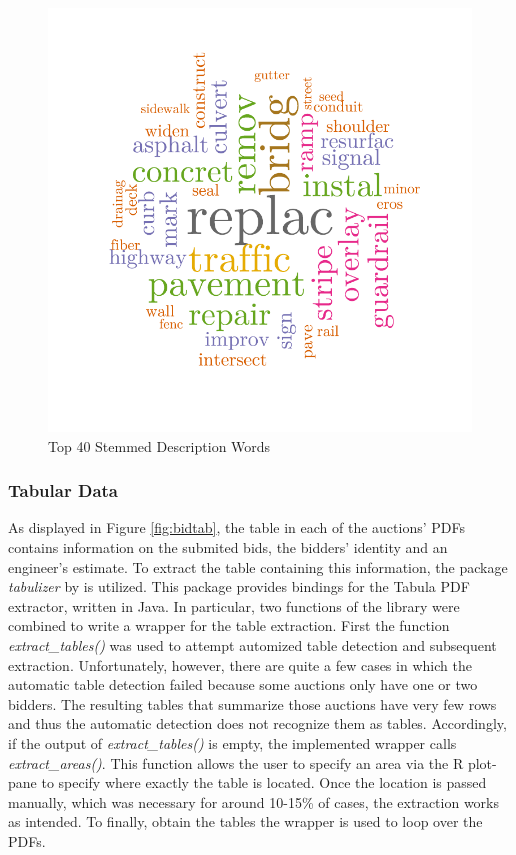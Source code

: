 \documentclass[a4paper,12pt, headsepline]{scrartcl}
\numberwithin{equation}{section}
\begin{document}
\begin{figure}[H]
	\includegraphics[width = 13.4	cm]{figures/description_words_cloud.pdf}
	\caption{Top 40 Stemmed Description Words}\label{fig:desc}
\end{figure}

\subsubsection{Tabular Data}\label{subsec:tab}

As displayed in Figure \ref{fig:bidtab}, the table in each of the auctions' PDFs contains information on the submited bids, the bidders' identity and an engineer's estimate. To extract the table containing this information, the package \textit{tabulizer} by \citet{tabulizer} is utilized. This package provides bindings for the Tabula PDF extractor, written in Java. In particular, two functions of the library were combined to write a wrapper for the table extraction. First the function \textit{extract\_tables()} was used to attempt automized table detection and subsequent extraction. Unfortunately, however, there are quite a few cases in which the automatic table detection failed because some auctions only have one or two bidders. The resulting tables that summarize those auctions have very few rows and thus the automatic detection does not recognize them as tables. Accordingly, if the output of \textit{extract\_tables()} is empty, the implemented wrapper calls \textit{extract\_areas()}. This function allows the user to specify an area via the R plot-pane to specify where exactly the table is located. Once the location is passed manually, which was necessary for around 10-15\% of cases, the extraction works as intended. To finally, obtain the tables the wrapper is used to loop over the PDFs.
\end{document}
